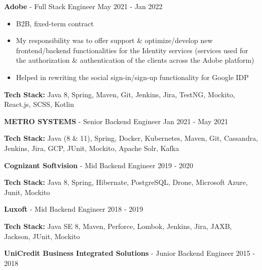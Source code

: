 \documentclass[11pt]{article}
\newcommand{\job}[3]{
    \begingroup
        \textbf{\small#1} - \small#2
        \hfill\color{black!70}\small{#3}
    \endgroup
}
\newcommand{\spacevv}{
    \vspace{2mm}
}
\begin{document}
\begin{paracol}{2}
{      \job{Adobe}{Full Stack Engineer}{May 2021 - Jan 2022}
      \begin{itemize}
        \item B2B, fixed-term contract
        \item My responsibility was to offer support \& optimize/develop new frontend/backend functionalities for the Identity services (services used for the authorization \& authentication of the clients across the Adobe platform)
        \item Helped in rewriting the social sign-in/sign-up functionality for Google IDP
      \end{itemize}
      \item \textbf{Tech Stack:} Java 8, Spring, Maven, Git, Jenkins, Jira, TestNG, Mockito, React.js, SCSS, Kotlin
      \spacevv
      \spacevv
      \spacevv

      \job{METRO SYSTEMS}{Senior Backend Engineer}{Jan 2021 - May 2021}
      \item \textbf{Tech Stack:} Java (8 \& 11), Spring, Docker, Kubernetes, Maven, Git, Cassandra, Jenkins, Jira, GCP, JUnit, Mockito, Apache Solr, Kafka
      \spacevv
      \spacevv
      \spacevv

      \job{Cognizant Softvision}{Mid Backend Engineer}{2019 - 2020}
      \item \textbf{Tech Stack:} Java 8, Spring, Hibernate, PostgreSQL, Drone, Microsoft Azure, Junit, Mockito
      \spacevv
      \spacevv
      \spacevv

      \job{Luxoft}{Mid Backend Engineer}{2018 - 2019}
      \item \textbf{Tech Stack:} Java SE 8, Maven, Perforce, Lombok, Jenkins, Jira, JAXB, Jackson, JUnit, Mockito
      \spacevv
      \spacevv
      \spacevv

      \job{UniCredit Business Integrated Solutions}{Junior Backend Engineer}{2015 - 2018}
    }
    
    \end{paracol}
\end{document}
